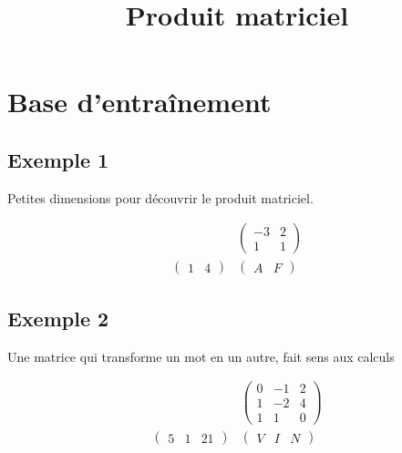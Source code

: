 \documentclass[a4paper,11pt]{article}
\begin{document}
\title{Produit matriciel}
\date{}
\maketitle

\section*{Base d'entraînement}

\bigskip

\subsection*{Exemple 1}
Petites dimensions pour découvrir le produit matriciel.

\vspace{2cm}

\[
\begin{array}{cc}
\, &

\left(
\begin{array}{cc}
-3 & 2 \\
1  & 1 
\end{array}
\right) \\

\left(
\begin{array}{cc}
1 & 4
\end{array}
\right) &

\left(
\begin{array}{cc}
A & F
\end{array}
\right)
\end{array}
\]

\subsection*{Exemple 2}
Une matrice qui transforme un mot en un autre, fait sens aux calculs

\vspace{2cm}

\[
\begin{array}{cc}
\, &

\left(
\begin{array}{ccc}
0 & -1 & 2 \\
1  & -2 & 4 \\
1 & 1 & 0 
\end{array}
\right) \\

\left(
\begin{array}{ccc}
5 & 1 & 21
\end{array}
\right) &

\left(
\begin{array}{ccc}
V & I & N
\end{array}
\right)
\end{array}
\]
\end{document}

